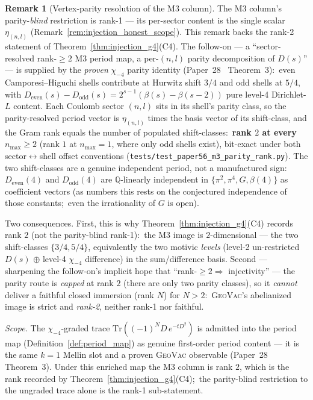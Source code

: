 \documentclass[11pt,a4paper]{article}
\theoremstyle{plain}
\theoremstyle{definition}
\newtheorem{remark}[theorem]{Remark}
\newcommand{\nmax}{n_{\max}}
\newcommand{\Q}{\mathbb{Q}}
\begin{document}
\begin{remark}[Vertex-parity resolution of the M3 column]\label{rem:m3_parity_rank}
The M3 column's parity-\emph{blind} restriction is rank-1 --- its
per-sector content is the single scalar $\eta_{(n,l)}$
(Remark~\ref{rem:injection_honest_scope}). This remark backs the rank-2
statement of Theorem~\ref{thm:injection_g4}(C4). The follow-on --- a
``sector-resolved rank-$\ge 2$ M3 period map,
a per-$(n,l)$ parity decomposition of $D(s)$'' --- is supplied by the
\emph{proven} $\chi_{-4}$ parity identity (Paper~28~\cite{loutey_paper28}
Theorem~3):\ even Camporesi--Higuchi shells contribute at Hurwitz shift $3/4$
and odd shells at $5/4$, with $D_{\mathrm{even}}(s) - D_{\mathrm{odd}}(s) =
2^{s-1}(\beta(s) - \beta(s-2))$ pure level-4 Dirichlet-$L$ content. Each Coulomb
sector $(n,l)$ sits in its shell's parity class, so the parity-resolved period
vector is $\eta_{(n,l)}$ times the basis vector of its shift-class, and the Gram
rank equals the number of populated shift-classes:\ \textbf{rank $2$ at every
$\nmax \ge 2$} (rank $1$ at $\nmax = 1$, where only odd shells exist), bit-exact
under both sector$\leftrightarrow$shell offset conventions
(\texttt{tests/test\_paper56\_m3\_parity\_rank.py}). The two shift-classes are a
genuine independent period, not a manufactured sign:\ $D_{\mathrm{even}}(4)$ and
$D_{\mathrm{odd}}(4)$ are $\Q$-linearly independent in
$\{\pi^2, \pi^4, G, \beta(4)\}$ as coefficient vectors (as numbers this
rests on the conjectured independence of those constants;\ even the
irrationality of $G$ is open).

Two consequences. First, this is why Theorem~\ref{thm:injection_g4}(C4)
records rank $2$ (not the parity-blind rank-1):\ the M3 image is
$2$-dimensional --- the two shift-classes $\{3/4, 5/4\}$, equivalently the
two motivic \emph{levels} (level-2 un-restricted $D(s)$ $\oplus$ level-4
$\chi_{-4}$ difference) in the sum/difference basis. Second --- sharpening the follow-on's implicit
hope that ``rank-$\ge 2 \Rightarrow$ injectivity'' --- the parity route is
\emph{capped} at rank $2$ (there are only two parity classes), so it
\emph{cannot} deliver a faithful closed immersion (rank $N$) for $N > 2$:\
\textsc{GeoVac}'s abelianized image is strict and \emph{rank-2}, neither
rank-1 nor faithful.

\emph{Scope.} The $\chi_{-4}$-graded trace
$\mathrm{Tr}((-1)^{N} D\,e^{-tD^2})$ is admitted into the period map
(Definition~\ref{def:period_map}) as genuine first-order period content
--- it is the same $k = 1$ Mellin slot and a proven \textsc{GeoVac}
observable (Paper~28~\cite{loutey_paper28} Theorem~3). Under this
enriched map the M3 column is rank $2$, which is the rank recorded by
Theorem~\ref{thm:injection_g4}(C4);\ the parity-blind restriction to the
ungraded trace alone is the rank-1 sub-statement.
\end{remark}
\end{document}

